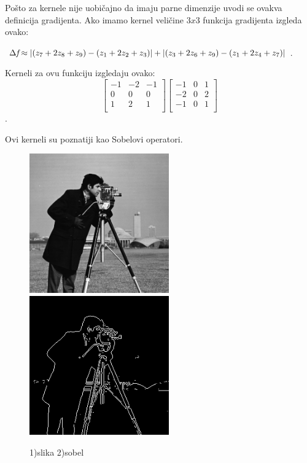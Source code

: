 \documentclass[a4paper,12pt,titlepage]{article}
\begin{document}
Pošto za kernele nije uobičajno da imaju parne dimenzije uvodi se ovakva definicija gradijenta. Ako imamo kernel veličine $3 x 3$ funkcija gradijenta izgleda ovako: 

\begin{center}
$\Delta \emph{f} \approx |(z_7 + 2z_8 + z_9) - (z_1 + 2z_2 + z_3)| + |(z_3 + 2z_6 + z_9) - (z_1 + 2z_4 + z_7)|$.\\
\end{center}

Kerneli za ovu funkciju izgledaju ovako: \\

 \[
\begin{bmatrix}
     -1 & -2 & -1 \\
     0 & 0 & 0 \\
     1 & 2 & 1 \\
\end{bmatrix}
\begin{bmatrix}
     -1 & 0 & 1 \\
     -2 & 0 & 2 \\
     -1 & 0 & 1 \\
\end{bmatrix}
\].

Ovi kerneli su poznatiji kao Sobelovi operatori. 

\begin{figure}[ht!]
\centering
\includegraphics[width=60mm]{img/img.png}
\includegraphics[width=60mm]{img/imgSob.png}
\caption{1)slika 2)sobel}
\label{overflow}
\end{figure}
\end{document}
